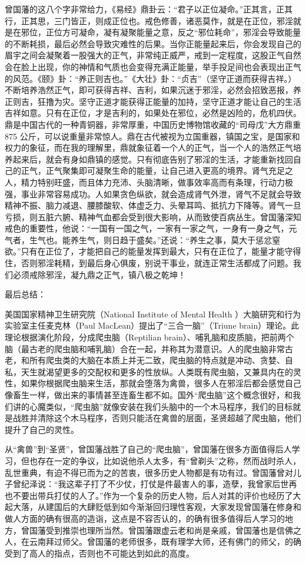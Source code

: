 曾国藩的这八个字非常给力，《易经》鼎卦云：“君子以正位凝命。”正其言，正其行，正其思，三门皆正，则成正位也。戒色修善，诸恶莫作，就是在正位，邪淫就是在邪位，正位方可凝命，凝有凝聚能量之意，反之“邪位耗命”，邪淫会导致能量的不断耗损，最后必然会导致灾难性的后果。当你正能量起来后，你会发现自己的眉宇之间会凝聚着一股强大的正气，非常纯正威严，戒到一定程度，这股正气自然会在脸上出现，你的神情和气质也会变得充满正能量，举手投足间也会表现出正气的风范。《颐》卦：“养正则吉也。”《大壮》卦：“贞吉”（坚守正道而获得吉祥。）不断培养浩然正气，即可获得吉祥、吉利，如果沉迷于邪淫，必然会招致恶报，养正则吉，狂撸为灾。坚守正道才能获得正能量的加持，坚守正道才能让自己的生活吉祥如意。只有在正位，才是吉利的，如果处在邪位，必然是凶险的，危机四伏。鼎是中国古代的一种青铜器，非常厚重，中国历史博物馆收藏的“司母戊”大方鼎重 875 公斤，可以说重量非常惊人。鼎在古代被视为立国重器，镇国之宝，是国家和权力的象征，而在我的理解里，鼎就象征着一个人的正气，当一个人的浩然正气培养起来后，就会有身如鼎镇的感觉。只有彻底告别了邪淫的生活，才能重新找回自己的正气，正气聚集即可凝聚生命的能量，让自己进入更高的境界。肾气充足之人，精力特别旺盛，而且体力充沛、头脑清晰，做事效率高而有条理，行动力极强，事业非常容易成功。人如果贪色纵欲，就会造成肾气外泄，肾气不足就会导致精神不振、脑力减退、腰膝酸软、体虚乏力、头晕耳鸣、抵抗力下降等。肾气一旦亏损，则五脏六腑、精神气血都会受到很大影响，从而致使百病丛生。曾国藩深知戒色的重要性，他说：“一国有一国之气，一家有一家之气，一身有一身之气，元气者，生气也。能养生气，则日趋于盛矣。”还说：“养生之事，莫大于惩忿窒欲。”只有在正位了，才能把自己的能量发挥到最大，只有在正位了，能量才能守得住，否则邪淫耗精，到最后身心俱废，别说干事业，就连正常生活都成了问题。我们必须戒除邪淫，凝九鼎之正气，镇八极之乾坤！

最后总结：

美国国家精神卫生研究院（National Institute of Mental Health ）大脑研究和行为实验室主任麦克林（Paul MacLean）提出了“三合一脑”（Triune brain）理论。此理论根据演化阶段，分成爬虫脑（Reptilian brain）、哺乳脑和皮质脑，把前两个脑（最古老的爬虫脑和哺乳脑）合在一起，并称其为潜意识。人的爬虫脑非常古老，和所有爬虫类的大脑在本质上并无二致，爬虫脑的特点就是冲动、贪婪、自私，天生就渴望更多的交配权和更多的性放纵。人类既有爬虫脑，又兼具内在的灵性，如果你根据爬虫脑来生活，那就会堕落为禽兽，很多人在邪淫后都会感觉自己像畜生一样，做出来的事情甚至连畜生都不如。国外“爬虫脑”这个概念很好，和我们讲的心魔类似，“爬虫脑”就像安装在我们头脑中的一个木马程序，我们的目标就是战胜并清除这个木马程序，否则只能活在禽兽的层面，圣贤超越了爬虫脑，他们提升了自己的灵性。

从“禽兽”到“圣贤”，曾国藩战胜了自己的“爬虫脑”，曾国藩在很多方面值得后人学习，但也存在一定的争议，比如说他杀人太多，有“曾剃头”之称，然而战时杀人，乱世重典，有迫不得已而为之的苦衷，很多历史人物都是有功有过。曾国藩曾对儿子曾纪泽说：“我这辈子打了不少仗，打仗是件最害人的事，造孽，我曾家后世再也不要出带兵打仗的人了。”作为一个复杂的历史人物，后人对其的评价也经历了大起大落，从建国后的大肆贬低到如今渐渐回归理性客观，大家发现曾国藩在修身和做人方面的确有很高的造诣，这点是不容否认的，的确有很多值得后人学习的地方，曾国藩受到推崇也理所当然。曾国藩跟虚云老和尚是亲戚，曾国藩也是信佛之人，在云南拜过师父。曾国藩的老师很多，既有理学大师，还有佛门的师父，的确受到了高人的指点，否则也不可能达到如此的高度。


